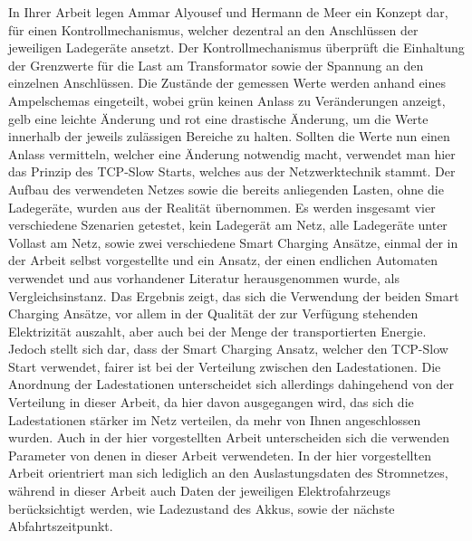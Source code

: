 In Ihrer Arbeit \cite{RW_3_1} legen  Ammar  Alyousef und Hermann de Meer ein Konzept dar, für einen Kontrollmechanismus, welcher dezentral an den Anschlüssen der jeweiligen Ladegeräte ansetzt. Der Kontrollmechanismus überprüft die Einhaltung der Grenzwerte für die Last am Transformator sowie der Spannung an den einzelnen Anschlüssen. Die Zustände der gemessen Werte werden anhand eines Ampelschemas eingeteilt, wobei grün keinen Anlass zu Veränderungen anzeigt, gelb eine leichte Änderung und rot eine drastische Änderung, um die Werte innerhalb der jeweils zulässigen Bereiche zu halten. Sollten die Werte nun einen Anlass vermitteln, welcher eine Änderung notwendig macht, verwendet man hier das Prinzip des TCP-Slow Starts, welches aus der Netzwerktechnik stammt. Der Aufbau des verwendeten Netzes sowie die bereits anliegenden Lasten, ohne die Ladegeräte, wurden aus der Realität übernommen. Es werden insgesamt vier verschiedene Szenarien getestet, kein Ladegerät am Netz, alle Ladegeräte unter Vollast am Netz, sowie zwei verschiedene Smart Charging Ansätze, einmal der in der Arbeit selbst vorgestellte und ein Ansatz, der einen endlichen Automaten verwendet und aus vorhandener Literatur herausgenommen wurde, als Vergleichsinstanz. Das Ergebnis zeigt, das sich die Verwendung der beiden Smart Charging Ansätze, vor allem in der Qualität der zur Verfügung stehenden Elektrizität auszahlt, aber auch bei der Menge der transportierten Energie. Jedoch stellt sich dar, dass der Smart Charging Ansatz, welcher den TCP-Slow Start verwendet, fairer ist bei der Verteilung zwischen den Ladestationen. Die Anordnung der Ladestationen unterscheidet sich allerdings dahingehend von der Verteilung in dieser Arbeit, da hier davon ausgegangen wird, das sich die Ladestationen stärker im Netz verteilen, da mehr von Ihnen angeschlossen wurden. Auch in der hier vorgestellten Arbeit unterscheiden sich die verwenden Parameter von denen in dieser Arbeit verwendeten. In der hier vorgestellten Arbeit orientriert man sich lediglich an den Auslastungsdaten des Stromnetzes, während in dieser Arbeit auch Daten der jeweiligen Elektrofahrzeugs berücksichtigt werden, wie Ladezustand des Akkus, sowie der nächste Abfahrtszeitpunkt. \\
